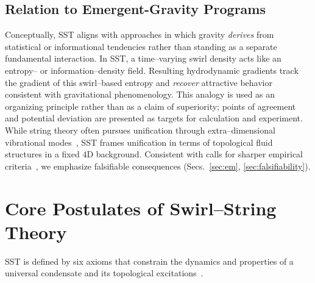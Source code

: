 \documentclass[10pt,reprint,aps,onecolumn,nofootinbib]{revtex4-2}
\begin{document}
    \subsection*{Relation to Emergent-Gravity Programs}
        Conceptually, SST aligns with approaches in which gravity \emph{derives} from statistical or informational tendencies rather than standing as a separate fundamental interaction. In SST, a time–varying swirl density acts like an entropy– or information–density field. Resulting hydrodynamic gradients track the gradient of this swirl–based entropy and \emph{recover} attractive behavior consistent with gravitational phenomenology. This analogy is used as an organizing principle rather than as a claim of superiority; points of agreement and potential deviation are presented as targets for calculation and experiment. While string theory often pursues unification through extra–dimensional vibrational modes~\cite{19}, SST frames unification in terms of topological fluid structures in a fixed 4D background. Consistent with calls for sharper empirical criteria~\cite{20}, we emphasize falsifiable consequences (Secs.~\ref{sec:em}, \ref{sec:falsifiability}).


\section{Core Postulates of Swirl–String Theory}
    \label{sec:postulates}
    SST is defined by six axioms that constrain the dynamics and properties of a universal condensate and its topological excitations~\cite{1}.
\end{document}
